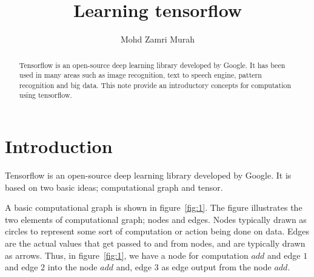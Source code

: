 \documentclass[vecarrow]{svproc}
\begin{document}
\mainmatter %

\title{Learning tensorflow} %

\author{Mohd Zamri Murah} %

\maketitle %

\begin{abstract}

Tensorflow is an open-source
deep learning library developed by Google.
It has been used in many areas such as image recognition, text
to speech engine, pattern recognition and
big data. This note provide an introductory concepts for
computation using tensorflow.


\end{abstract} %

\section{Introduction}

Tensorflow is an open-source deep learning library
developed by Google\cite{abadi2015tensorflow}. It is based on
two basic ideas; computational graph and
tensor.

A basic computational graph is shown in
figure~\ref{fig:1}. The figure illustrates the two
elements of computational graph; nodes and edges. Nodes
typically drawn as circles to represent some sort
of computation or action being done on data. Edges are the
actual values that get passed to and from
nodes, and are typically drawn as arrows. Thus, in
figure~\ref{fig:1}, we have a node for computation
$add$  and edge $1$ and edge $2$ into the node $add$ and,
edge $3$ as edge output from the node
$add$.
\end{document}
